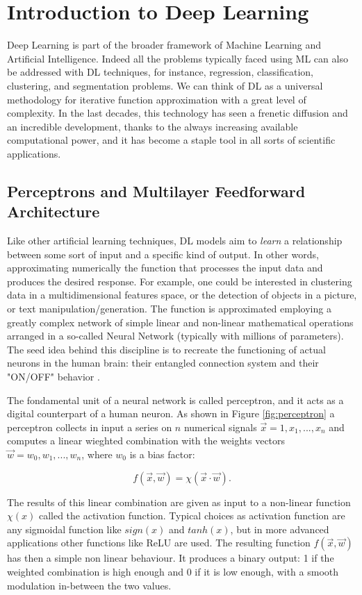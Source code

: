 \section{Introduction to Deep Learning}
Deep Learning is part of the broader framework of Machine Learning and Artificial Intelligence. Indeed all the problems typically faced using ML can also be addressed with DL techniques, for instance, regression, classification, clustering, and segmentation problems. We can think of DL as a universal methodology for iterative function approximation with a great level of complexity. In the last decades, this technology has seen a frenetic diffusion and an incredible development, thanks to the always increasing available computational power, and it has become a staple tool in all sorts of scientific applications.

\subsection{Perceptrons and Multilayer Feedforward Architecture}
Like other artificial learning techniques, DL models aim to \textit{learn} a relationship between some sort of input and a specific kind of output. In other words,  approximating numerically the function that processes the input data and produces the desired response. For example, one could be interested in clustering data in a multidimensional features space, or the detection of objects in a picture, or text manipulation/generation. The function is approximated employing a greatly complex network of simple linear and non-linear mathematical operations arranged in a so-called Neural Network (typically with millions of parameters). The seed idea behind this discipline is to recreate the functioning of actual neurons in the human brain: their entangled connection system and their "ON/OFF" behavior \cite{10.5555/3275328}.

The fondamental unit of a neural network is called perceptron, and it acts as a digital counterpart of a human neuron. As shown in Figure \ref{fig:perceptron} a perceptron collects in input a series on $n$ numerical signals $\vec{x} = 1, x_1, ..., x_n $ and computes a linear wieghted combination with the weights vectors $\vec{w} = w_0, w_1, ..., w_n$, where $w_0$ is a bias factor:

\begin{equation}
    f(\vec{x},\vec{w}) = \chi(\vec{x} \cdot \vec{w}).
\end{equation}

The results of this linear combination are given as input to a non-linear function $\chi(x)$ called the activation function. Typical choices as activation function are any sigmoidal function like $sign(x)$ and $tanh(x)$, but in more advanced applications other functions like ReLU \cite{1803.08375} are used. The resulting function $f(\vec{x},\vec{w})$ has then a simple non linear behaviour. It produces a binary output: 1 if the weighted combination is high enough and 0 if it is low enough, with a smooth modulation in-between the two values.

